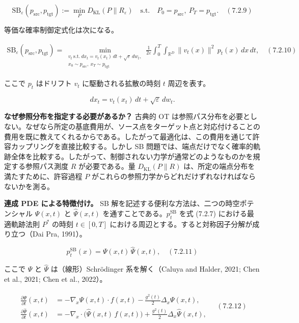 \[
\mathrm{SB}_\varepsilon(p_{\mathrm{src}},p_{\mathrm{tgt}})
:=
\min_P D_{\mathrm{KL}}(P\|R_\varepsilon)
\quad\text{s.t.}\quad
P_0=p_{\mathrm{src}},\ P_T=p_{\mathrm{tgt}}.
\quad (7.2.9)
\]


等価な確率制御定式化は次になる。

\begin{align*}
\mathrm{SB}_\varepsilon(p_{\mathrm{src}},p_{\mathrm{tgt}})
=
\min_{\substack{v_t\ \mathrm{s.t.}\ dx_t=v_t(x_t)\,dt+\sqrt{\varepsilon}\,dw_t,\\ x_0\sim p_{\mathrm{src}},\ x_T\sim p_{\mathrm{tgt}}}}
\frac{1}{2\varepsilon}\int_0^T\int_{\mathbb{R}^D}\|v_t(x)\|^2\,p_t(x)\,dx\,dt,
\quad (7.2.10)
\end{align*}


ここで $p_t$ はドリフト $v_t$ に駆動される拡散の時刻 $t$ 周辺を表す。

\[
dx_t=v_t(x_t)\,dt+\sqrt{\varepsilon}\,dw_t.
\]


\textbf{なぜ参照分布を指定する必要があるか？} 古典的 OT は参照パス分布を必要としない。なぜなら所定の基底費用が、ソース点をターゲット点と対応付けることの費用を既に教えてくれるからである。したがって最適化は、この費用を通じて許容カップリングを直接比較する。しかし SB 問題では、端点だけでなく確率的軌跡全体を比較する。したがって、制御されない力学が通常どのようなものかを規定する参照パス測度 $R$ が必要である。量 $D_{\mathrm{KL}}(P\|R)$ は、所定の端点分布を満たすために、許容過程 $P$ がこれらの参照力学からどれだけずれなければならないかを測る。

\textbf{連成 PDE による特徴付け。} SB 解を記述する便利な方法は、二つの時空ポテンシャル $\Psi(x,t)$ と $\widehat{\Psi}(x,t)$ を通すことである。$p_t^{\mathrm{SB}}$ を式 (7.2.7) における最適軌跡法則 $P^*$ の時刻 $t\in[0,T]$ における周辺とする。すると対称因子分解が成り立つ（Dai Pra, 1991）。

\[
p_t^{\mathrm{SB}}(x)=\Psi(x,t)\,\widehat{\Psi}(x,t),
\quad (7.2.11)
\]


ここで $\Psi$ と $\widehat{\Psi}$ は（線形）Schrödinger 系を解く（Caluya and Halder, 2021; Chen et al., 2021; Chen et al., 2022）。

\begin{align*}
\begin{aligned}
\frac{\partial\Psi}{\partial t}(x,t)
&=
-\nabla_x\Psi(x,t)\cdot f(x,t)-\frac{g^2(t)}{2}\Delta_x\Psi(x,t),\\
\frac{\partial\widehat{\Psi}}{\partial t}(x,t)
&=
-\nabla_x\cdot\bigl(\widehat{\Psi}(x,t)\,f(x,t)\bigr)+\frac{g^2(t)}{2}\Delta_x\widehat{\Psi}(x,t),
\end{aligned}
\quad (7.2.12)
\end{align*}


